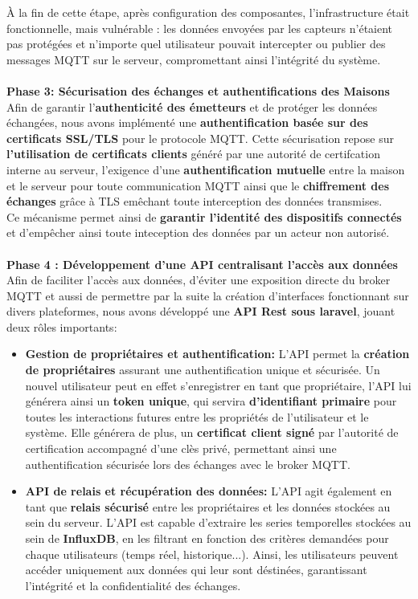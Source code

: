 \documentclass[10pt, a4paper]{report}
\begin{document}
	À la fin de cette étape, après configuration des composantes, l’infrastructure était fonctionnelle, mais vulnérable : les données envoyées par les capteurs n’étaient pas protégées et n’importe quel utilisateur pouvait intercepter ou publier des messages MQTT sur le serveur, compromettant ainsi l’intégrité du système.\\\\
	\textbf{Phase 3: Sécurisation des échanges et authentifications des Maisons}\\
	Afin de garantir l'\textbf{authenticité des émetteurs} et de protéger les données échangées, nous avons implémenté une \textbf{authentification basée sur des certificats SSL/TLS} pour le protocole MQTT. Cette sécurisation repose sur \textbf{l'utilisation de certificats clients} généré par une autorité de certifcation interne au serveur, l'exigence d'une \textbf{authentification mutuelle} entre la maison et le serveur pour toute communication MQTT ainsi que le \textbf{chiffrement des échanges} grâce à TLS emêchant toute interception des données transmises.\\
	Ce mécanisme permet ainsi de \textbf{garantir l'identité des dispositifs connectés} et d'empêcher ainsi toute inteception des données par un acteur non autorisé.\\\\
	\textbf{Phase 4 : Développement d’une API centralisant l’accès aux données}\\
	Afin de faciliter l'accès aux données, d'éviter une exposition directe du broker MQTT et aussi de permettre par la suite la création d'interfaces fonctionnant sur divers plateformes, nous avons développé une \textbf{API Rest sous laravel}, jouant deux rôles importants:\\
	\begin{itemize}
		\item \textbf{Gestion de propriétaires et authentification:} L'API permet la \textbf{création de propriétaires} assurant une authentification unique et sécurisée. Un nouvel utilisateur peut en effet s'enregistrer en tant que propriétaire, l'API lui générera ainsi un \textbf{token unique}, qui servira \textbf{d'identifiant primaire} pour toutes les interactions futures entre les propriétés de l'utilisateur et le système. Elle générera de plus, un \textbf{certificat client signé} par l'autorité de certification accompagné d'une clès privé, permettant ainsi une authentification sécurisée lors des échanges avec le broker MQTT.
		
		\item \textbf{API de relais et récupération des données: } L'API agit également en tant que \textbf{relais sécurisé} entre les propriétaires et les données stockées au sein du serveur. L'API est capable d'extraire les series temporelles stockées au sein de \textbf{InfluxDB}, en les filtrant en fonction des critères demandées pour chaque utilisateurs (temps réel, historique...). Ainsi, les utilisateurs peuvent accéder uniquement aux données qui leur sont déstinées, garantissant l'intégrité et la confidentialité des échanges.
	\end{itemize}
	 
\end{document}
